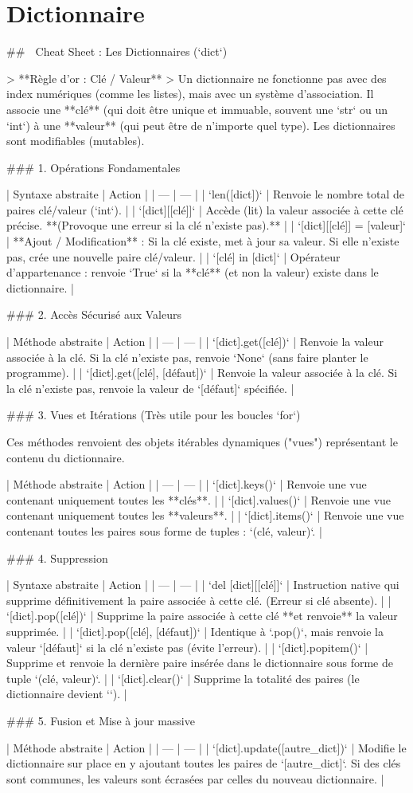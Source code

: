 \section{Dictionnaire}

## 🐍 Cheat Sheet : Les Dictionnaires (`dict`)

> **Règle d'or : Clé / Valeur**
> Un dictionnaire ne fonctionne pas avec des index numériques (comme les listes), mais avec un système d'association. Il associe une **clé** (qui doit être unique et immuable, souvent une `str` ou un `int`) à une **valeur** (qui peut être de n'importe quel type). Les dictionnaires sont modifiables (mutables).

### 1. Opérations Fondamentales

| Syntaxe abstraite | Action |
| --- | --- |
| `len([dict])` | Renvoie le nombre total de paires clé/valeur (`int`). |
| `[dict][[clé]]` | Accède (lit) la valeur associée à cette clé précise. **(Provoque une erreur si la clé n'existe pas).** |
| `[dict][[clé]] = [valeur]` | **Ajout / Modification** : Si la clé existe, met à jour sa valeur. Si elle n'existe pas, crée une nouvelle paire clé/valeur. |
| `[clé] in [dict]` | Opérateur d'appartenance : renvoie `True` si la **clé** (et non la valeur) existe dans le dictionnaire. |

### 2. Accès Sécurisé aux Valeurs

| Méthode abstraite | Action |
| --- | --- |
| `[dict].get([clé])` | Renvoie la valeur associée à la clé. Si la clé n'existe pas, renvoie `None` (sans faire planter le programme). |
| `[dict].get([clé], [défaut])` | Renvoie la valeur associée à la clé. Si la clé n'existe pas, renvoie la valeur de `[défaut]` spécifiée. |

### 3. Vues et Itérations (Très utile pour les boucles `for`)

Ces méthodes renvoient des objets itérables dynamiques ("vues") représentant le contenu du dictionnaire.

| Méthode abstraite | Action |
| --- | --- |
| `[dict].keys()` | Renvoie une vue contenant uniquement toutes les **clés**. |
| `[dict].values()` | Renvoie une vue contenant uniquement toutes les **valeurs**. |
| `[dict].items()` | Renvoie une vue contenant toutes les paires sous forme de tuples : `(clé, valeur)`. |

### 4. Suppression

| Syntaxe abstraite | Action |
| --- | --- |
| `del [dict][[clé]]` | Instruction native qui supprime définitivement la paire associée à cette clé. (Erreur si clé absente). |
| `[dict].pop([clé])` | Supprime la paire associée à cette clé **et renvoie** la valeur supprimée. |
| `[dict].pop([clé], [défaut])` | Identique à `.pop()`, mais renvoie la valeur `[défaut]` si la clé n'existe pas (évite l'erreur). |
| `[dict].popitem()` | Supprime et renvoie la dernière paire insérée dans le dictionnaire sous forme de tuple `(clé, valeur)`. |
| `[dict].clear()` | Supprime la totalité des paires (le dictionnaire devient `{}`). |

### 5. Fusion et Mise à jour massive

| Méthode abstraite | Action |
| --- | --- |
| `[dict].update([autre_dict])` | Modifie le dictionnaire sur place en y ajoutant toutes les paires de `[autre_dict]`. Si des clés sont communes, les valeurs sont écrasées par celles du nouveau dictionnaire. |